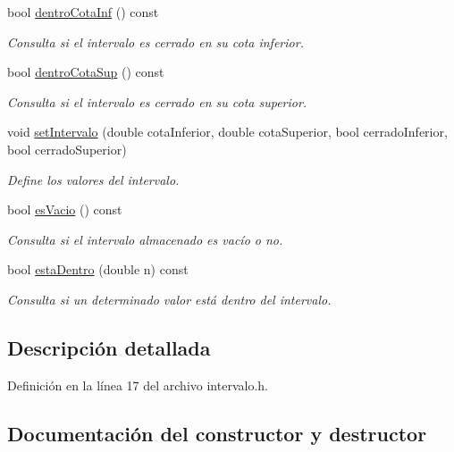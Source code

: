\begin{DoxyCompactItemize}
bool \mbox{\hyperlink{classIntervalo_aac8f7b98dd0d702086ea897f5c9ad932}{dentro\+Cota\+Inf}} () const
\begin{DoxyCompactList}\small\item\em Consulta si el intervalo es cerrado en su cota inferior. \end{DoxyCompactList}\item 
bool \mbox{\hyperlink{classIntervalo_aed0964a68d4b727bd104f5128ee7a7ef}{dentro\+Cota\+Sup}} () const
\begin{DoxyCompactList}\small\item\em Consulta si el intervalo es cerrado en su cota superior. \end{DoxyCompactList}\item 
void \mbox{\hyperlink{classIntervalo_a3e7cfa7c148a4e60be7040fecf506313}{set\+Intervalo}} (double cota\+Inferior, double cota\+Superior, bool cerrado\+Inferior, bool cerrado\+Superior)
\begin{DoxyCompactList}\small\item\em Define los valores del intervalo. \end{DoxyCompactList}\item 
bool \mbox{\hyperlink{classIntervalo_adc77e18147f9f9f85476a0d44257bb02}{es\+Vacio}} () const
\begin{DoxyCompactList}\small\item\em Consulta si el intervalo almacenado es vacío o no. \end{DoxyCompactList}\item 
bool \mbox{\hyperlink{classIntervalo_a2cccd9264f1b3912c6006fe3e2a70289}{esta\+Dentro}} (double n) const
\begin{DoxyCompactList}\small\item\em Consulta si un determinado valor está dentro del intervalo. \end{DoxyCompactList}\end{DoxyCompactItemize}


\subsection{Descripción detallada}


Definición en la línea 17 del archivo intervalo.\+h.



\subsection{Documentación del constructor y destructor}
\mbox{\label{classIntervalo_a321e56ef7e1f4a774bd64cc2609156f4}} 
